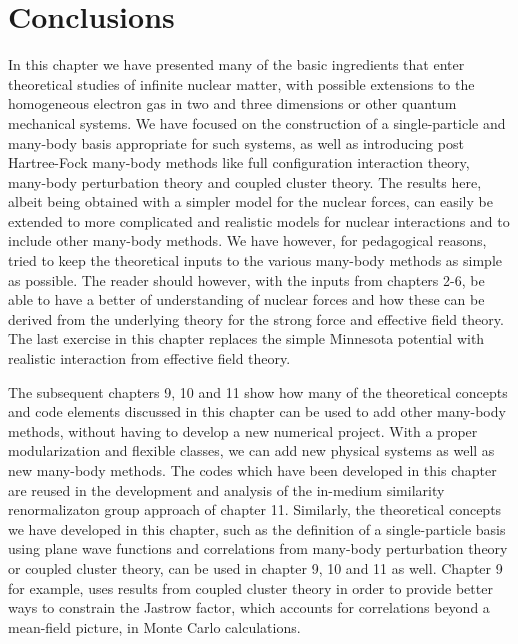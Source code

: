 \section{Conclusions}
In this chapter we have presented many of the basic ingredients that
enter theoretical studies of infinite nuclear matter, with possible
extensions to the homogeneous electron gas in two and three dimensions
or other quantum mechanical systems.  We have focused on the
construction of a single-particle and many-body basis appropriate for
such systems, as well as introducing post Hartree-Fock many-body
methods like full configuration interaction theory, many-body
perturbation theory and coupled cluster theory. The results here,
albeit being obtained with a simpler model for the nuclear forces, can
easily be extended to more complicated and realistic models for
nuclear interactions and to include other many-body methods. We have
however, for pedagogical reasons, tried to keep the theoretical inputs
to the various many-body methods as simple as possible. The reader
should however, with the inputs from chapters 2-6, be able to have a
better of understanding of nuclear forces and how these can be derived
from the underlying theory for the strong force and effective field
theory.  The last exercise in this chapter replaces the simple Minnesota potential with
realistic interaction from effective field theory. 

The subsequent chapters 9, 10 and 11 show how many of the theoretical
concepts and code elements discussed in this chapter can be used to
add other many-body methods, without having to develop a new numerical
project.  With a proper modularization and flexible classes, we can
add new physical systems as well as new many-body methods.  The codes
which have been developed in this chapter are reused in the
development and analysis of the in-medium similarity renormalizaton
group approach of chapter 11. Similarly, the theoretical concepts we
have developed in this chapter, such as the definition of a
single-particle basis using plane wave functions and correlations from
many-body perturbation theory or coupled cluster theory, can be used
in chapter 9, 10 and 11 as well. Chapter 9 for example, uses results
from coupled cluster theory in order to provide better ways to constrain
the Jastrow factor, which accounts for correlations beyond a mean-field picture, 
in Monte Carlo calculations.


